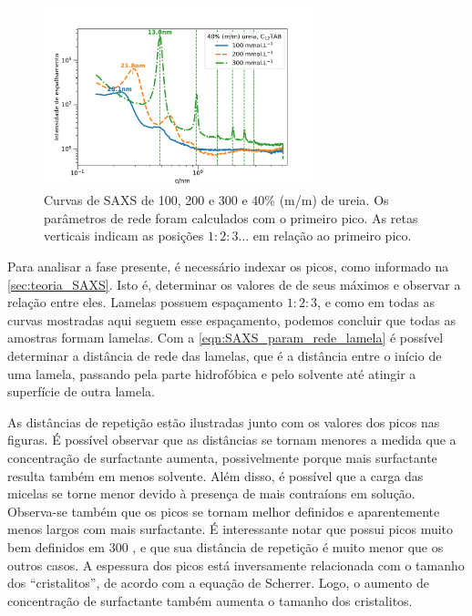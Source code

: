 	\begin{figure}[h]
		\centering
		\includegraphics[width=0.7\textwidth]{imagens/saxs/DTAB_conc}
		\caption{Curvas de SAXS de \DTAB{} 100, 200 e 300 \mM{} e 40\% (m/m) de ureia. Os parâmetros de rede foram calculados com o primeiro pico. As retas verticais indicam as posições \(1:2:3\dots\) em relação ao primeiro pico.}
		\label{fig:SAXS_dtabconc}
	\end{figure}
	
	Para analisar a fase presente, é necessário indexar os picos, como informado na \autoref{sec:teoria_SAXS}. Isto é, determinar os valores de \q{} de seus máximos e observar a relação entre eles. Lamelas possuem espaçamento \(1:2:3\), e como em todas as curvas mostradas aqui seguem esse espaçamento, podemos concluir que todas as amostras formam lamelas. Com a \autoref{eqn:SAXS_param_rede_lamela} é possível determinar a distância de rede das lamelas, que é a distância entre o início de uma lamela, passando pela parte hidrofóbica e pelo solvente até atingir a superfície de outra lamela.

	As distâncias de repetição estão ilustradas junto com os valores dos picos nas figuras. É possível observar que as distâncias se tornam menores a medida que a concentração de surfactante aumenta, possivelmente porque mais surfactante resulta também em menos solvente. Além disso, é possível que a carga das micelas se torne menor devido à presença de mais contraíons em solução. Observa-se também que os picos se tornam melhor definidos e aparentemente menos largos com mais surfactante. É interessante notar que \DTAB{} possui picos muito bem definidos em 300 \mM, e que sua distância de repetição é muito menor que os outros casos. A espessura dos picos está inversamente relacionada com o tamanho dos ``cristalitos'', de acordo com a equação de Scherrer.\cite{Kockrick2008} Logo, o aumento de concentração de surfactante também aumenta o tamanho dos cristalitos.
	
